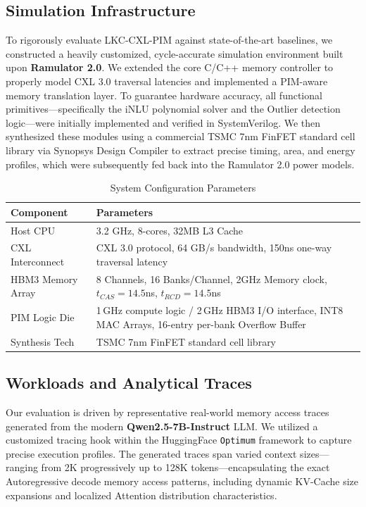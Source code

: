 \documentclass[10pt,conference]{IEEEtran}
\begin{document}
\subsection{Simulation Infrastructure}
To rigorously evaluate LKC-CXL-PIM against state-of-the-art baselines, we constructed a heavily customized, cycle-accurate simulation environment built upon \textbf{Ramulator 2.0}. We extended the core C/C++ memory controller to properly model CXL 3.0 traversal latencies and implemented a PIM-aware memory translation layer. To guarantee hardware accuracy, all functional primitives—specifically the iNLU polynomial solver and the Outlier detection logic—were initially implemented and verified in SystemVerilog. We then synthesized these modules using a commercial TSMC 7nm FinFET standard cell library via Synopsys Design Compiler to extract precise timing, area, and energy profiles, which were subsequently fed back into the Ramulator 2.0 power models.

\begin{table}[htbp]
\caption{System Configuration Parameters}
\centering
\begin{tabular}{lp{5cm}}
\toprule
\textbf{Component} & \textbf{Parameters} \\
\midrule
Host CPU              & 3.2 GHz, 8-cores, 32MB L3 Cache \\
CXL Interconnect      & CXL 3.0 protocol, 64 GB/s bandwidth, 150ns one-way traversal latency \\
HBM3 Memory Array     & 8 Channels, 16 Banks/Channel, 2GHz Memory clock, $t_{CAS}=14.5$ns, $t_{RCD}=14.5$ns \\
PIM Logic Die      & 1\,GHz compute logic / 2\,GHz HBM3 I/O interface, INT8 MAC Arrays, 16-entry per-bank Overflow Buffer \\
Synthesis Tech & TSMC 7nm FinFET standard cell library \\
\bottomrule
\end{tabular}
\label{tab:system_config}
\end{table}

\subsection{Workloads and Analytical Traces}
Our evaluation is driven by representative real-world memory access traces generated from the modern \textbf{Qwen2.5-7B-Instruct} LLM. We utilized a customized tracing hook within the HuggingFace \texttt{Optimum} framework to capture precise execution profiles. The generated traces span varied context sizes—ranging from 2K progressively up to 128K tokens—encapsulating the exact Autoregressive decode memory access patterns, including dynamic KV-Cache size expansions and localized Attention distribution characteristics.
\end{document}
